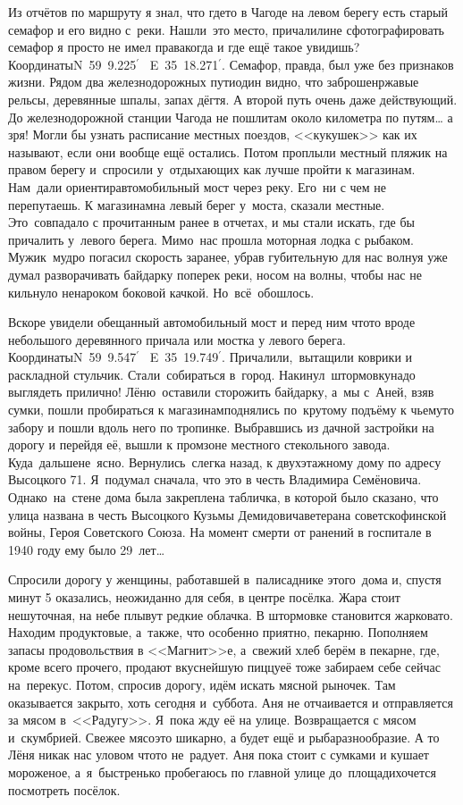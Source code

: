 Из отчётов по маршруту я знал, что где\sdash то в Чагоде на левом берегу есть старый семафор и его видно с~реки. Нашли~это место, причалили\mdash не сфотографировать семафор я просто не имел права\mdash когда и где ещё такое увидишь? Координаты\mdash N~59\degree~9.225$^\prime$~ E~35\degree~18.271$^\prime$. Семафор, правда, был уже без признаков жизни. Рядом два железнодорожных пути\mdash один видно, что заброшен\mdash ржавые рельсы, деревянные шпалы, запах дёгтя. А второй путь очень даже действующий. До железнодорожной станции Чагода не пошли\mdash там около километра по путям… а зря! Могли бы узнать расписание местных поездов, <<кукушек>> как их называют, если они вообще ещё остались. 
\newpage
Потом проплыли местный пляжик на правом берегу и~спросили у~отдыхающих как лучше пройти к магазинам. Нам~дали ориентир\mdash автомобильный мост через реку. Его~ни с чем не перепутаешь. К магазинам\mdash на левый берег у~моста, сказали местные. Это~совпадало с прочитанным ранее в отчетах, и мы стали искать, где бы причалить у~левого берега. Мимо~нас прошла моторная лодка с рыбаком. Мужик~мудро погасил скорость заранее, убрав губительную для нас волну\mdash я уже думал разворачивать байдарку поперек реки, носом на волны, чтобы нас не кильнуло ненароком боковой качкой. Но~всё~обошлось. 

Вскоре увидели обещанный автомобильный мост и перед ним что\sdash то вроде небольшого деревянного причала или мостка у левого берега. Координаты\mdash N~59\degree~9.547$^\prime$~ E~35\degree~19.749$^\prime$. Причалили,~вытащили коврики и раскладной стульчик. Стали~собираться в~город. Накинул~штормовку\mdash надо выглядеть прилично! Лёню~оставили сторожить байдарку, а~мы с~Аней, взяв сумки, пошли пробираться к магазинам\mdash поднялись по~крутому подъёму к чьему\sdash то забору и пошли вдоль него по тропинке. Выбравшись из дачной застройки на дорогу и перейдя её, вышли к промзоне местного стекольного завода. Куда~дальше\mdash не~ясно. Вернулись~слегка назад, к двухэтажному дому по адресу Высоцкого 71. Я~подумал сначала, что это в честь Владимира Семёновича. Однако~на~стене дома была закреплена табличка, в которой было сказано, что улица названа в честь Высоцкого Кузьмы Демидовича\mdash ветерана советско\sdash финской войны, Героя Советского Союза. На момент смерти от ранений в госпитале в 1940 году ему было 29~лет\ldots 

Спросили дорогу у женщины, работавшей в~палисаднике этого~дома и, спустя минут 5 оказались, неожиданно для себя, в центре посёлка. Жара стоит нешуточная, на небе плывут редкие облачка. В штормовке становится жарковато. Находим продуктовые, а~также, что особенно приятно, пекарню. Пополняем запасы продовольствия в <<Магнит>>\sdash е, а~свежий хлеб берём в пекарне, где, кроме всего прочего, продают вкуснейшую пиццу\mdash её тоже забираем себе сейчас на~перекус. Потом, спросив дорогу, идём искать мясной рыночек. Там оказывается закрыто, хоть сегодня и~суббота. Аня не отчаивается и отправляется за мясом в~<<Радугу>>. Я~пока жду её на улице. Возвращается с мясом и~скумбрией. Свежее мясо\mdash это шикарно, а будет ещё и рыба\mdash разнообразие. А то Лёня никак нас уловом что\sdash то не~радует. Аня пока стоит с сумками и кушает мороженое, а~я~быстренько пробегаюсь по главной улице до~площади\mdash хочется посмотреть посёлок.

